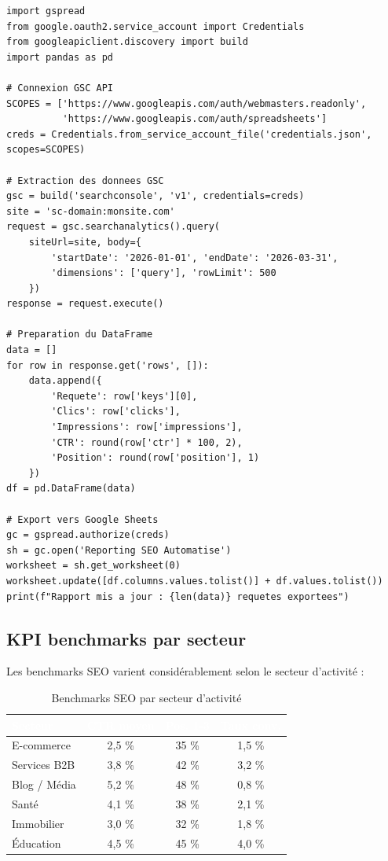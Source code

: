 \documentclass[12pt,a4paper,twoside]{report}
\begin{document}
\begin{lstlisting}[style=htmlcode,caption={Script Python pour automatiser le reporting SEO}]
import gspread
from google.oauth2.service_account import Credentials
from googleapiclient.discovery import build
import pandas as pd

# Connexion GSC API
SCOPES = ['https://www.googleapis.com/auth/webmasters.readonly',
          'https://www.googleapis.com/auth/spreadsheets']
creds = Credentials.from_service_account_file('credentials.json', scopes=SCOPES)

# Extraction des donnees GSC
gsc = build('searchconsole', 'v1', credentials=creds)
site = 'sc-domain:monsite.com'
request = gsc.searchanalytics().query(
    siteUrl=site, body={
        'startDate': '2026-01-01', 'endDate': '2026-03-31',
        'dimensions': ['query'], 'rowLimit': 500
    })
response = request.execute()

# Preparation du DataFrame
data = []
for row in response.get('rows', []):
    data.append({
        'Requete': row['keys'][0],
        'Clics': row['clicks'],
        'Impressions': row['impressions'],
        'CTR': round(row['ctr'] * 100, 2),
        'Position': round(row['position'], 1)
    })
df = pd.DataFrame(data)

# Export vers Google Sheets
gc = gspread.authorize(creds)
sh = gc.open('Reporting SEO Automatise')
worksheet = sh.get_worksheet(0)
worksheet.update([df.columns.values.tolist()] + df.values.tolist())
print(f"Rapport mis a jour : {len(data)} requetes exportees")
\end{lstlisting}

\subsection{KPI benchmarks par secteur}

Les benchmarks SEO varient considérablement selon le secteur d'activité :

\begin{table}[H]
\centering
\caption{Benchmarks SEO par secteur d'activité}
\label{tab:kpi_benchmarks}
\begin{tabular}{|l|c|c|c|}
\hline
\rowcolor{primary}\textcolor{white}{\textbf{Secteur}} & \textcolor{white}{\textbf{CTR moyen}} & \textcolor{white}{\textbf{Pos. 1-3}} & \textcolor{white}{\textbf{Taux conv.}} \\
\hline
E-commerce & 2,5 \% & 35 \% & 1,5 \% \\
\hline
Services B2B & 3,8 \% & 42 \% & 3,2 \% \\
\hline
Blog / Média & 5,2 \% & 48 \% & 0,8 \% \\
\hline
Santé & 4,1 \% & 38 \% & 2,1 \% \\
\hline
Immobilier & 3,0 \% & 32 \% & 1,8 \% \\
\hline
Éducation & 4,5 \% & 45 \% & 4,0 \% \\
\hline
\end{tabular}
\end{table}
\end{document}
